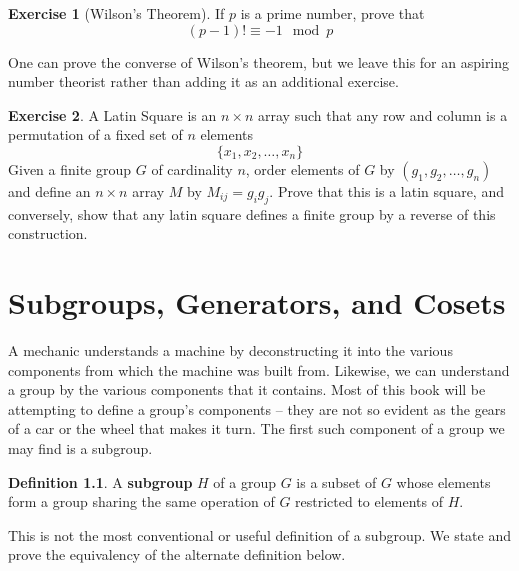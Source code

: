 \documentclass[12pt]{amsbook}
\theoremstyle{definition}
\newtheorem{exercise}{Exercise}[chapter]
\newtheorem{definition}{Definition}
\begin{document}
\begin{exercise}[Wilson's Theorem] 
    If $p$ is a prime number, prove that
    \[ (p - 1)! \equiv -1 \mod{p} \]
\end{exercise}

One can prove the converse of Wilson's theorem, but we leave this for an aspiring number theorist rather than adding it as an additional exercise.

\begin{exercise}
    A Latin Square  is an $n \times n$ array such that any row and column is a permutation of a fixed set of $n$ elements
    \[ \{ x_1, x_2, \dots, x_n \} \]
    Given a finite group $G$ of cardinality $n$, order elements of $G$ by $(g_1, g_2, \dots, g_n)$ and define an $n \times n$ array $M$ by $M_{ij} = g_i g_j$. Prove that this is a latin square, and conversely, show that any latin square defines a finite group by a reverse of this construction.
\end{exercise}





\chapter{Subgroups, Generators, and Cosets}

A mechanic understands a machine by deconstructing it into the various components from which the machine was built from. Likewise, we can understand a group by the various components that it contains. Most of this book will be attempting to define a group's components -- they are not so evident as the gears of a car or the wheel that makes it turn. The first such component of a group we may find is a subgroup.

\begin{definition}
    A {\bf subgroup} $H$ of a group $G$ is a subset of $G$ whose elements form a group sharing the same operation of $G$ restricted to elements of $H$.
\end{definition}

This is not the most conventional or useful definition of a subgroup. We state and prove the equivalency of the alternate definition below.
\end{document}

